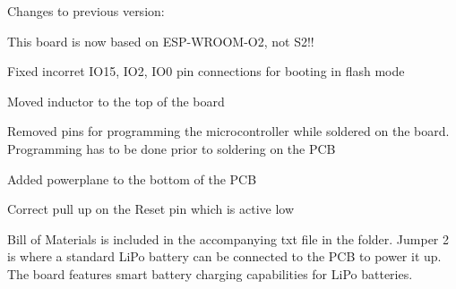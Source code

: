 Changes to previous version\+:


\begin{DoxyItemize}
\item This board is now based on E\+S\+P-\/\+W\+R\+O\+O\+M-\/\+O2, not S2!!
\item Fixed incorret I\+O15, I\+O2, I\+O0 pin connections for booting in flash mode
\item Moved inductor to the top of the board
\item Removed pins for programming the microcontroller while soldered on the board. Programming has to be done prior to soldering on the P\+CB
\item Added powerplane to the bottom of the P\+CB
\item Correct pull up on the Reset pin which is active low
\end{DoxyItemize}

Bill of Materials is included in the accompanying txt file in the folder. Jumper 2 is where a standard Li\+Po battery can be connected to the P\+CB to power it up. The board features smart battery charging capabilities for Li\+Po batteries. 